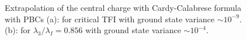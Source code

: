 	\begin{figure}[h!]
		\hspace{-0.4cm}
		\quad
		\caption{Extrapolation of the central charge with Cardy-Calabrese formula with PBCs (a): for critical TFI with ground state variance $\sim 10^{-9}$. (b): for $\lambda_3/\lambda_I = 0.856$ with ground state variance $\sim 10^{-4}$.}
		\label{fig:cPBCs}
	\end{figure}


